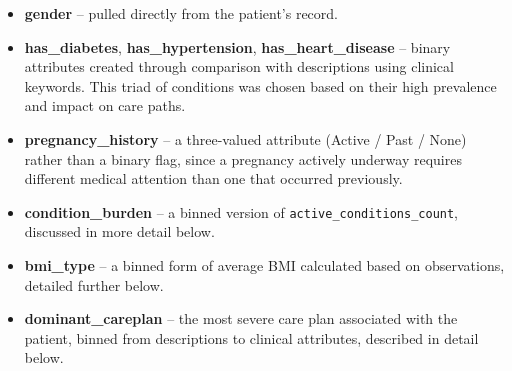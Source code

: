 \begin{itemize}

    \item \textbf{gender} -- pulled directly from the patient’s record.

    \item \textbf{has\_diabetes}, \textbf{has\_hypertension}, \textbf{has\_heart\_disease} -- binary attributes created through comparison with descriptions using clinical keywords. This triad of conditions was chosen based on their high prevalence and impact on care paths.

    \item \textbf{pregnancy\_history} -- a three-valued attribute (Active / Past / None) rather than a binary flag, since a pregnancy actively underway requires different medical attention than one that occurred previously.

    \item \textbf{condition\_burden} -- a binned version of \texttt{active\_conditions\_count}, discussed in more detail below.

    \item \textbf{bmi\_type} -- a binned form of average BMI calculated based on observations, detailed further below.

    \item \textbf{dominant\_careplan} -- the most severe care plan associated with the patient, binned from descriptions to clinical attributes, described in detail below.

\end{itemize}

